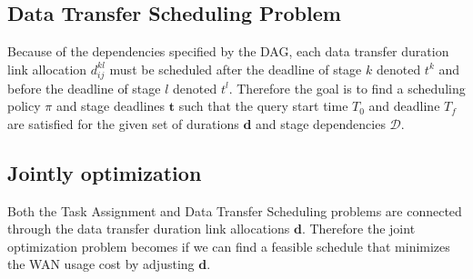 \subsection{Data Transfer Scheduling Problem}

Because of the dependencies specified by the DAG, each data transfer duration link allocation $d_{ij}^{kl}$ must be scheduled after the deadline of stage $k$ denoted $t^k$ and before the deadline of stage $l$ denoted $t^l$.
Therefore the goal is to find a scheduling policy $\pi$ and stage deadlines $\mathbf{t}$ such that the query start time $T_0$ and deadline $T_f$ are satisfied for the given set of durations $\mathbf{d}$ and stage dependencies $\mathcal{D}$.

\subsection{Jointly optimization}

Both the Task Assignment and Data Transfer Scheduling problems are connected through the data transfer duration link allocations $\mathbf{d}$.
Therefore the joint optimization problem becomes if we can find a feasible schedule that minimizes the WAN usage cost by adjusting $\mathbf{d}$.